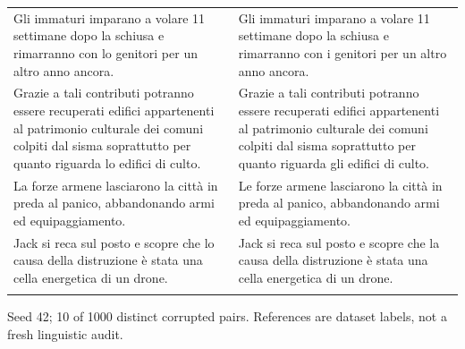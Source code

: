 \documentclass[10pt]{article}
\begin{document}
{\begin{tabular}{@{}>{\raggedright\arraybackslash}p{}@{\hspace{0.04\textwidth}}>{\raggedright\arraybackslash}p{}@{}}
Gli immaturi imparano a volare 11 settimane dopo la schiusa e rimarranno con lo genitori per un altro anno ancora. & Gli immaturi imparano a volare 11 settimane dopo la schiusa e rimarranno con i genitori per un altro anno ancora. \\ \addlinespace[5pt]
Grazie a tali contributi potranno essere recuperati edifici appartenenti al patrimonio culturale dei comuni colpiti dal sisma soprattutto per quanto riguarda lo edifici di culto. & Grazie a tali contributi potranno essere recuperati edifici appartenenti al patrimonio culturale dei comuni colpiti dal sisma soprattutto per quanto riguarda gli edifici di culto. \\ \addlinespace[5pt]
La forze armene lasciarono la città in preda al panico, abbandonando armi ed equipaggiamento. & Le forze armene lasciarono la città in preda al panico, abbandonando armi ed equipaggiamento. \\ \addlinespace[5pt]
Jack si reca sul posto e scopre che lo causa della distruzione è stata una cella energetica di un drone. & Jack si reca sul posto e scopre che la causa della distruzione è stata una cella energetica di un drone. \\ \addlinespace[5pt]
\bottomrule\end{tabular}}%
\ifdim\dimexpr\ht\pairtable+\dp\pairtable\relax>0.82\textheight%
\resizebox*{!}{0.82\textheight}{\usebox{\pairtable}}%
\else\usebox{\pairtable}\fi%
\par\smallskip\footnotesize Seed 42; 10 of 1000 distinct corrupted pairs. References are dataset labels, not a fresh linguistic audit.\normalsize
\clearpage
\end{document}
